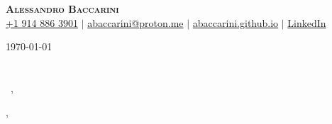 \documentclass[12pt]{letter}
\begin{document}


\begin{center}
    \textbf{\Huge \scshape Alessandro Baccarini} \\ \vspace{1pt}
    \small \href{tel:19148863901}{ +1 914 886 3901}  
    $|$
    \href{mailto:abaccarini@proton.me}{{ abaccarini@proton.me}} 
    $|$
    \href{https://abaccarini.github.io/}{{ \url{abaccarini.github.io}}} 
    $|$
    \href{https://www.linkedin.com/in/alessandro-baccarini/}{{ LinkedIn}} 
\end{center}




\vspace{0.8in}

\today\\

\vspace{-0.1in}\recipient\\
\company\\

\vspace{-0.1in}\greeting\ \recipient,\\
\vspace{-0.1in}\setlength\parindent{24pt}
\noindent

\vspace{0.1in}

\begin{flushright}
\closer,\\
\myname\\
\mytitle
\end{flushright}
\end{document}
